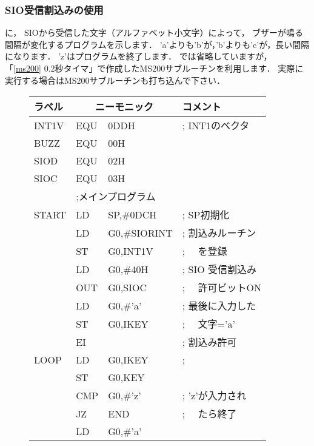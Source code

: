 \subsubsection{SIO受信割込みの使用}
に，
SIOから受信した文字（アルファベット小文字）によって，
ブザーが鳴る間隔が変化するプログラムを示します．
'a'よりも'b'が，'b'よりも'c'が，長い間隔になります．
'z'はプログラムを終了します．
では省略していますが，
「\ref{ms200} 0.2秒タイマ」で作成したMS200サブルーチンを利用します．
実際に実行する場合はMS200サブルーチンも打ち込んで下さい．

\begin{figure}[btp]
{\small\tt\begin{center}
\begin{tabular}{|l|l l l|} \hline
ラベル & \multicolumn{2}{|c}{ニーモニック} & コメント  \\
\hline
INT1V   & EQU     & 0DDH           & ; INT1のベクタ\\
BUZZ    & EQU     & 00H            & \\
SIOD    & EQU     & 02H            & \\
SIOC    & EQU     & 03H            & \\
        & \multicolumn{3}{|l|}{;メインプログラム}        \\
START   & LD      & SP,\#0DCH      & ; SP初期化\\
        & LD      & G0,\#SIORINT   & ; 割込みルーチン\\
        & ST      & G0,INT1V       & ; 　を登録\\
        & LD      & G0,\#40H       & ; SIO 受信割込み\\
        & OUT     & G0,SIOC        & ; 　許可ビットON\\
        & LD      & G0,\#'a'       & ; 最後に入力した\\
        & ST      & G0,IKEY        & ; 　文字='a'\\
        & EI      &                & ; 割込み許可\\
LOOP    & LD      & G0,IKEY        & ; \\
        & ST      & G0,KEY         & \\
        & CMP     & G0,\#'z'       & ; 'z'が入力され\\
        & JZ      & END            & ; 　たら終了\\
        & LD      & G0,\#'a'       & \\

\end{tabular}
\end{center}}
\end{figure}
